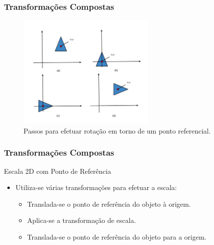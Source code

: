 \documentclass{beamer}
\begin{document}
\begin{frame}
\frametitle{Transformações Compostas}
	
	\begin{figure}[!h]
		\begin{center}
			\includegraphics[width=0.6\textwidth]{Figures/RotacaoPontoFixo}
			\caption{Passos para efetuar rotação em torno de um ponto referencial.}
		\end{center}
	\end{figure}
	
\end{frame}

\begin{frame}
\frametitle{Transformações Compostas}
	\begin{block}{Escala 2D com Ponto de Referência}
		\begin{itemize}
			\item Utiliza-se várias transformações para efetuar a escala:
				\begin{itemize}
					\item Translada-se o ponto de referência do objeto à origem.
					\item Aplica-se a transformação de escala.
					\item Translada-se o ponto de referência do objeto para a origem.
				\end{itemize}
		\end{itemize}						

	\end{block}
	
	

\end{frame}		
\end{document}
